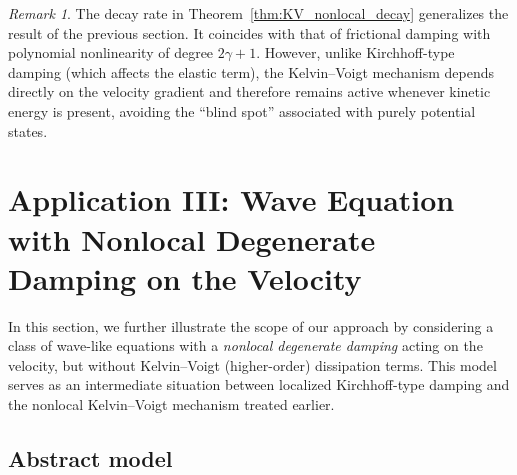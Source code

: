 \documentclass[11pt,reqno]{amsart}
\theoremstyle{remark}
\newtheorem{remark}[theorem]{Remark}
\begin{document}
\begin{remark}
The decay rate in Theorem~\ref{thm:KV_nonlocal_decay} generalizes the result of the previous section. It coincides with that of
frictional damping with polynomial nonlinearity of degree $2\gamma+1$.
However, unlike Kirchhoff-type damping (which affects the elastic term), the Kelvin--Voigt mechanism depends directly on
the velocity gradient and therefore remains active whenever kinetic energy is
present, avoiding the ``blind spot'' associated with purely potential states.
\end{remark}




\section{Application III: Wave Equation with Nonlocal Degenerate Damping on the Velocity}
\label{sec:app_nonlocal_degenerate}

In this section, we further illustrate the scope of our approach by considering
a class of wave-like equations with a \emph{nonlocal degenerate damping} acting on
the velocity, but without Kelvin--Voigt (higher-order) dissipation terms.
This model serves as an intermediate situation between localized Kirchhoff-type
damping and the nonlocal Kelvin--Voigt mechanism treated earlier.

\subsection{Abstract model}
\end{document}
